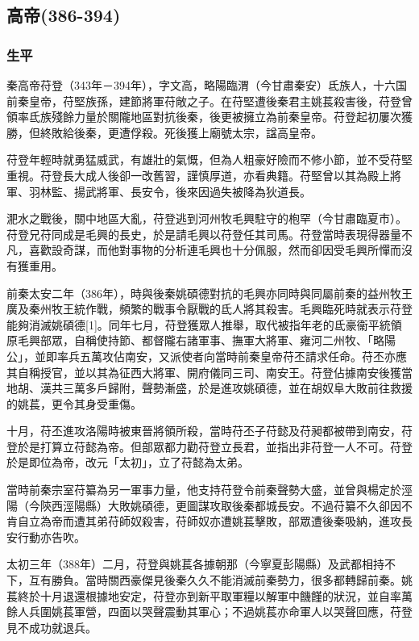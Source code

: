 
\subsection{高帝\tiny(386-394)}

\subsubsection{生平}

秦高帝苻登（343年－394年），字文高，略陽臨渭（今甘肅秦安）氐族人，十六国前秦皇帝，苻堅族孫，建節將軍苻敞之子。在苻堅遭後秦君主姚萇殺害後，苻登曾領率氐族殘餘力量於關隴地區對抗後秦，後更被擁立為前秦皇帝。苻登起初屢次獲勝，但終敗給後秦，更遭俘殺。死後獲上廟號太宗，諡高皇帝。

苻登年輕時就勇猛威武，有雄壯的氣慨，但為人粗豪好險而不修小節，並不受苻堅重視。苻登長大成人後卻一改舊習，謹慎厚道，亦看典籍。苻堅曾以其為殿上將軍、羽林監、揚武將軍、長安令，後來因過失被降為狄道長。

淝水之戰後，關中地區大亂，苻登逃到河州牧毛興駐守的枹罕（今甘肅臨夏市）。苻登兄苻同成是毛興的長史，於是請毛興以苻登任其司馬。苻登當時表現得器量不凡，喜歡設奇謀，而他對事物的分析連毛興也十分佩服，然而卻因受毛興所憚而沒有獲重用。

前秦太安二年（386年），時與後秦姚碩德對抗的毛興亦同時與同屬前秦的益州牧王廣及秦州牧王統作戰，頻繁的戰事令厭戰的氐人將其殺害。毛興臨死時就表示苻登能夠消滅姚碩德[1]。同年七月，苻登獲眾人推舉，取代被指年老的氐豪衞平統領原毛興部眾，自稱使持節、都督隴右諸軍事、撫軍大將軍、雍河二州牧、「略陽公」，並即率兵五萬攻佔南安，又派使者向當時前秦皇帝苻丕請求任命。苻丕亦應其自稱授官，並以其為征西大將軍、開府儀同三司、南安王。苻登佔據南安後獲當地胡、漢共三萬多戶歸附，聲勢漸盛，於是進攻姚碩德，並在胡奴阜大敗前往救援的姚萇，更令其身受重傷。

十月，苻丕進攻洛陽時被東晉將領所殺，當時苻丕子苻懿及苻昶都被帶到南安，苻登於是打算立苻懿為帝。但部眾都力勸苻登立長君，並指出非苻登一人不可。苻登於是即位為帝，改元「太初」，立了苻懿為太弟。

當時前秦宗室苻纂為另一軍事力量，他支持苻登令前秦聲勢大盛，並曾與楊定於涇陽（今陝西涇陽縣）大敗姚碩德，更圖謀攻取後秦都城長安。不過苻纂不久卻因不肯自立為帝而遭其弟苻師奴殺害，苻師奴亦遭姚萇擊敗，部眾遭後秦吸納，進攻長安行動亦告吹。

太初三年（388年）二月，苻登與姚萇各據朝那（今寧夏彭陽縣）及武都相持不下，互有勝負。當時關西豪傑見後秦久久不能消滅前秦勢力，很多都轉歸前秦。姚萇終於十月退還根據地安定，苻登亦到新平取軍糧以解軍中饑饉的狀況，並自率萬餘人兵圍姚萇軍營，四面以哭聲震動其軍心；不過姚萇亦命軍人以哭聲回應，苻登見不成功就退兵。

